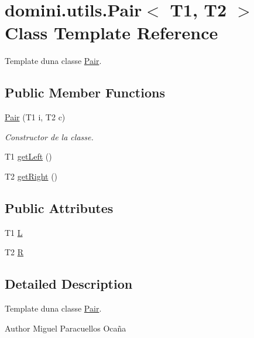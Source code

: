 \hypertarget{classdomini_1_1utils_1_1Pair}{}\section{domini.\+utils.\+Pair$<$ T1, T2 $>$ Class Template Reference}
\label{classdomini_1_1utils_1_1Pair}


Template d\textquotesingle{}una classe \hyperlink{classdomini_1_1utils_1_1Pair}{Pair}.  


\subsection*{Public Member Functions}
\begin{DoxyCompactItemize}
\item 
\hyperlink{classdomini_1_1utils_1_1Pair_a9db8755d5034cf4f99f9007b9d6fd22d}{Pair} (T1 i, T2 c)
\begin{DoxyCompactList}\small\item\em Constructor de la classe. \end{DoxyCompactList}\item 
T1 \hyperlink{classdomini_1_1utils_1_1Pair_a9439fbd8488cb1fbf00c57f15f093c4b}{get\+Left} ()
\item 
T2 \hyperlink{classdomini_1_1utils_1_1Pair_a0dca94eb1a43952258bebe1dca4c84e9}{get\+Right} ()
\end{DoxyCompactItemize}
\subsection*{Public Attributes}
\begin{DoxyCompactItemize}
\item 
T1 \hyperlink{classdomini_1_1utils_1_1Pair_a276a0eee9fa97fc27b37fab887f07cea}{L}
\item 
T2 \hyperlink{classdomini_1_1utils_1_1Pair_aebf54d48000999b84e5e24a2c62088d4}{R}
\end{DoxyCompactItemize}


\subsection{Detailed Description}
Template d\textquotesingle{}una classe \hyperlink{classdomini_1_1utils_1_1Pair}{Pair}. 

\begin{DoxyAuthor}{Author}
Miguel Paracuellos Ocaña 
\end{DoxyAuthor}


